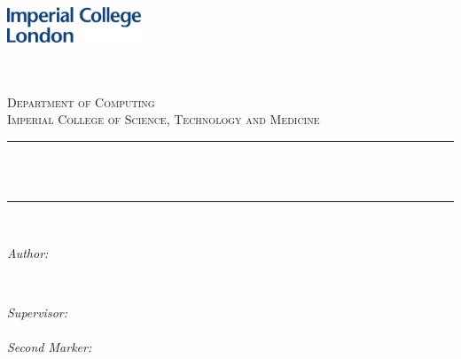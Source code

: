 \begin{titlepage}

\newcommand{\HRule}{\rule{\linewidth}{0.5mm}} %


\includegraphics[width = 4cm]{./imperial}\\[0.5cm] 

\center %
 

\textsc{\LARGE \degreetype}\\
\textsc{\LARGE \subdegreetype}\\[1.5cm] 
\textsc{\Large Department of Computing}\\[0.5cm] 
\textsc{\large Imperial College of Science, Technology and Medicine}\\[0.5cm] 


\HRule \\[0.4cm]
{ \huge \bfseries \reporttitle}\\ %
\HRule \\[1.5cm]
 

\begin{minipage}{0.4\textwidth}
\begin{flushleft} \large
\emph{Author:}\\
\reportauthor %
\end{flushleft}
\end{minipage}
~
\begin{minipage}{0.5\textwidth}
\begin{flushright} \large
\emph{Supervisor:} \\
\supervisor %
\\ \vspace{1cm}
\emph{Second Marker:} \\
\secondmarker
\end{flushright}
\end{minipage}\\[4cm]





\end{titlepage}
